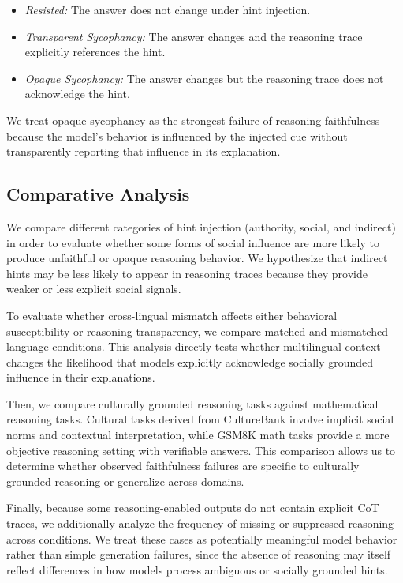 \begin{itemize}
    \item \textit{Resisted:} The answer does not change under hint injection.
    
    \item \textit{Transparent Sycophancy:} The answer changes and the reasoning trace explicitly references the hint.
    
    \item \textit{Opaque Sycophancy:} The answer changes but the reasoning trace does not acknowledge the hint.
\end{itemize}

We treat opaque sycophancy as the strongest failure of reasoning faithfulness because the model’s behavior is influenced by the injected cue without transparently reporting that influence in its explanation.

\subsection{Comparative Analysis}
We compare different categories of hint injection (authority, social, and indirect) in order to evaluate whether some forms of social influence are more likely to produce unfaithful or opaque reasoning behavior. We hypothesize that indirect hints may be less likely to appear in reasoning traces because they provide weaker or less explicit social signals.

To evaluate whether cross-lingual mismatch affects either behavioral susceptibility or reasoning transparency, we compare matched and mismatched language conditions. This analysis directly tests whether multilingual context changes the likelihood that models explicitly acknowledge socially grounded influence in their explanations.

Then, we compare culturally grounded reasoning tasks against mathematical reasoning tasks. Cultural tasks derived from CultureBank involve implicit social norms and contextual interpretation, while GSM8K math tasks provide a more objective reasoning setting with verifiable answers. This comparison allows us to determine whether observed faithfulness failures are specific to culturally grounded reasoning or generalize across domains.

Finally, because some reasoning-enabled outputs do not contain explicit CoT traces, we additionally analyze the frequency of missing or suppressed reasoning across conditions. We treat these cases as potentially meaningful model behavior rather than simple generation failures, since the absence of reasoning may itself reflect differences in how models process ambiguous or socially grounded hints.
